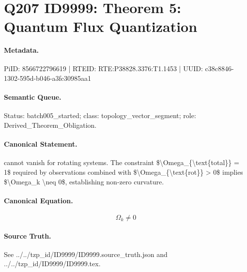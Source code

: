 \section*{Q207 ID9999: Theorem 5: Quantum Flux Quantization}
\paragraph{Metadata.}
PiID: 8566722796619 | RTEID: RTE:P38828.3376:T1.1453 | UUID: c38c8846-1302-595d-b046-a3fc30985aa1

\paragraph{Semantic Queue.}
Status: batch005\_started; class: topology\_vector\_segment; role: Derived\_Theorem\_Obligation.

\paragraph{Canonical Statement.}
cannot vanish for rotating systems. The constraint \$\textbackslash{}Omega\_\{\textbackslash{}text\{total\}\} = 1\$ required by observations combined with \$\textbackslash{}Omega\_\{\textbackslash{}text\{rot\}\} > 0\$ implies \$\textbackslash{}Omega\_k \textbackslash{}neq 0\$, establishing non-zero curvature.

\paragraph{Canonical Equation.}
\[
\Omega_k \neq 0
\]

\paragraph{Source Truth.}
See ../../tzp\_id/ID9999/ID9999.source\_truth.json and ../../tzp\_id/ID9999/ID9999.tex.
